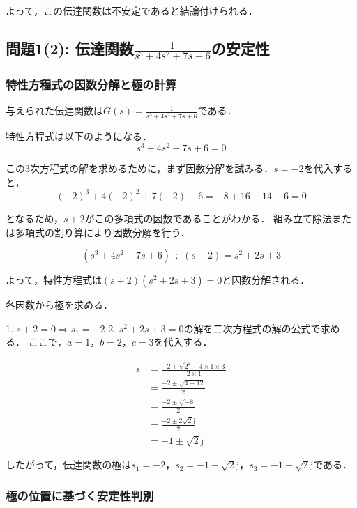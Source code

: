 \documentclass[11pt,a4paper]{ltjsarticle}
\begin{document}
よって，この伝達関数は不安定であると結論付けられる．

\subsection{問題1(2): \texorpdfstring{伝達関数$\frac{1}{s^3+4s^2+7s+6}$の安定性}{伝達関数の安定性}}

\subsubsection{特性方程式の因数分解と極の計算}

与えられた伝達関数は$G(s) = \frac{1}{s^3+4s^2+7s+6}$である．

特性方程式は以下のようになる．
\begin{equation}
s^3+4s^2+7s+6=0
\end{equation}

この3次方程式の解を求めるために，まず因数分解を試みる．$s=-2$を代入すると，
\begin{equation}
(-2)^3+4(-2)^2+7(-2)+6=-8+16-14+6=0
\end{equation}

となるため，$s+2$がこの多項式の因数であることがわかる．
組み立て除法または多項式の割り算により因数分解を行う．

\begin{equation}
(s^3+4s^2+7s+6) \div (s+2) = s^2+2s+3
\end{equation}

よって，特性方程式は$(s+2)(s^2+2s+3)=0$と因数分解される．

各因数から極を求める．

1. $s+2=0 \Rightarrow s_1=-2$
2. $s^2+2s+3=0$の解を二次方程式の解の公式で求める．
   ここで，$a=1$，$b=2$，$c=3$を代入する．

\begin{align}
s &= \frac{-2 \pm \sqrt{2^2-4 \times 1 \times 3}}{2 \times 1} \\
&= \frac{-2 \pm \sqrt{4-12}}{2} \\
&= \frac{-2 \pm \sqrt{-8}}{2} \\
&= \frac{-2 \pm 2\sqrt{2}\mathrm{j}}{2} \\
&= -1 \pm \sqrt{2}\mathrm{j}
\end{align}

したがって，伝達関数の極は$s_1=-2$，$s_2=-1+\sqrt{2}\mathrm{j}$，$s_3=-1-\sqrt{2}\mathrm{j}$である．

\subsubsection{極の位置に基づく安定性判別}
\end{document}
